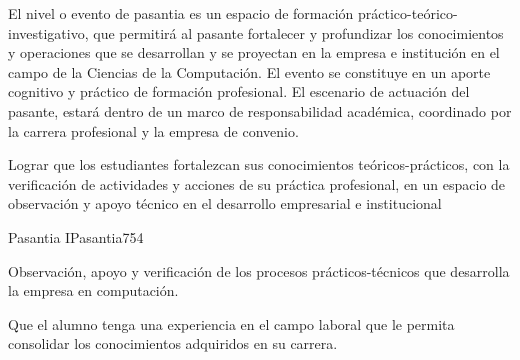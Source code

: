 \begin{syllabus}


\begin{justification}
El nivel o evento de pasantia es un espacio de formación práctico-teórico-investigativo, que permitirá al pasante fortalecer y profundizar los conocimientos y operaciones que se desarrollan y se proyectan en la empresa e institución en el campo de la Ciencias de la Computación. El evento se constituye en un aporte cognitivo y práctico de formación profesional. El escenario de actuación del pasante, estará dentro de un marco de responsabilidad académica, coordinado por la carrera profesional y la empresa de convenio.
\end{justification}

\begin{goals}
\item Lograr que los estudiantes fortalezcan sus conocimientos teóricos-prácticos, con la verificación de actividades y acciones de su práctica profesional, en un espacio de observación y apoyo técnico en el desarrollo empresarial e institucional  
\end{goals}

\begin{outcomes}
\end{outcomes}

\begin{unit}{Pasantia I}{Pasantia}{75}{4}
   \begin{topics}
      \item Observación, apoyo y verificación de los procesos prácticos-técnicos que desarrolla la empresa en computación.
   \end{topics}
   
   \begin{learningoutcomes}
      \item Que el alumno tenga una experiencia en el campo laboral que le permita consolidar los conocimientos adquiridos en su carrera.
   \end{learningoutcomes}
\end{unit}

\begin{coursebibliography}
\end{coursebibliography}

\end{syllabus}
